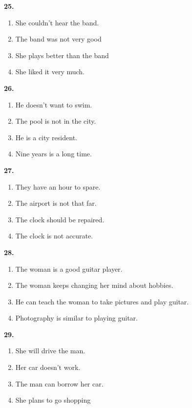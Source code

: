 \documentclass[12pt]{article}
\begin{document}
\par
\vspace{0.25\baselineskip}
\noindent\textbf{25.}
\begin{enumerate}[label=(\Alph*),leftmargin=*,itemsep=0.2em]
\item She couldn't hear the band.
\item The band was not very good
\item She plays better than the band
\item She liked it very much.
\end{enumerate}
\par
\vspace{0.25\baselineskip}
\noindent\textbf{26.}
\begin{enumerate}[label=(\Alph*),leftmargin=*,itemsep=0.2em]
\item He doesn't want to swim.
\item The pool is not in the city.
\item He is a city resident.
\item Nine years is a long time.
\end{enumerate}
\par
\vspace{0.25\baselineskip}
\noindent\textbf{27.}
\begin{enumerate}[label=(\Alph*),leftmargin=*,itemsep=0.2em]
\item They have an hour to spare.
\item The airport is not that far.
\item The clock should be repaired.
\item The clock is not accurate.
\end{enumerate}
\par
\vspace{0.25\baselineskip}
\noindent\textbf{28.}
\begin{enumerate}[label=(\Alph*),leftmargin=*,itemsep=0.2em]
\item The woman is a good guitar player.
\item The woman keeps changing her mind about hobbies.
\item He can teach the woman to take pictures and play guitar.
\item Photography is similar to playing guitar.
\end{enumerate}
\par
\vspace{0.25\baselineskip}
\noindent\textbf{29.}
\begin{enumerate}[label=(\Alph*),leftmargin=*,itemsep=0.2em]
\item She will drive the man.
\item Her car doesn't work.
\item The man can borrow her car.
\item She plans to go shopping
\end{enumerate}
\end{document}
